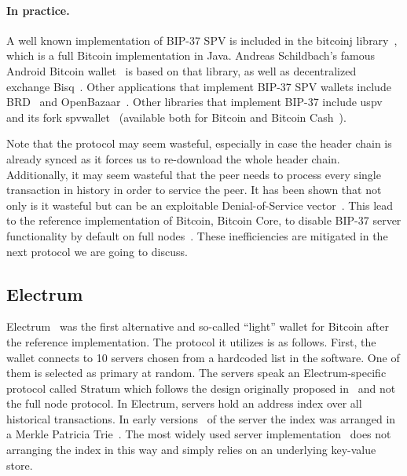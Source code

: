 

\paragraph{In practice.} A well known implementation of BIP-37 SPV is included in the bitcoinj library~\cite{bitcoinj}, which is a full Bitcoin implementation in Java. Andreas Schildbach's famous Android Bitcoin wallet~\cite{schildbach} is based on that library, as well as decentralized exchange Bisq~\cite{bisq}. Other applications that implement BIP-37 SPV wallets include BRD~\cite{brd} and OpenBazaar~\cite{openbazaar}. Other libraries that implement BIP-37 include uspv~\cite{uspv} and its fork spvwallet~\cite{spvwallet} (available both for Bitcoin and Bitcoin Cash~\cite{bch-spv}).

Note that the protocol may seem wasteful, especially in case the header chain is already synced as it forces us to re-download the whole header chain. Additionally, it may seem wasteful that the peer needs to process every single transaction in history in order to service the peer. It has been shown that not only is it wasteful but can be an exploitable Denial-of-Service vector~\cite{todd-bip37-attack}. This lead to the reference implementation of Bitcoin, Bitcoin Core, to disable BIP-37 server functionality by default on full nodes~\cite{bip37-disable}. These inefficiencies are mitigated in the next protocol we are going to discuss.


\subsection{Electrum}
Electrum~\cite{electrum} was the first alternative and so-called ``light'' wallet for Bitcoin after the reference implementation.
The protocol it utilizes is as follows. First, the wallet connects to 10 servers chosen from a hardcoded list in the software. One of them is selected as primary at random. The servers speak an Electrum-specific protocol called Stratum which follows the design originally proposed in~\cite{stratum} and not the full node protocol.
In Electrum, servers hold an address index over all historical transactions. In early versions~\cite{electrumserver} of the server the index was arranged in a Merkle Patricia Trie~\cite{ultimate}. The most widely used server implementation~\cite{electrumserverrust} does not arranging the index in this way and simply relies on an underlying key-value store.

